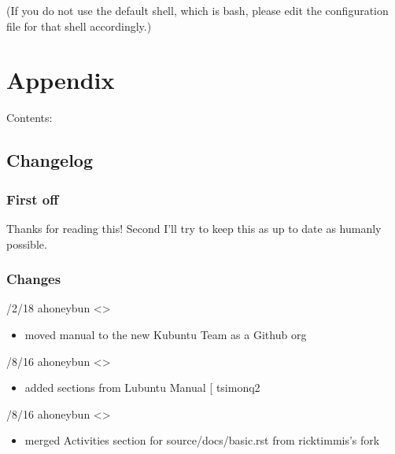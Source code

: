 \documentclass[letterpaper,10pt,english]{sphinxmanual}
\begin{document}
\sphinxAtStartPar
(If you do not use the default shell, which is bash, please edit the configuration file for that shell accordingly.)


\chapter{Appendix}
\label{\detokenize{docs/appendix/appendix:appendix}}\label{\detokenize{docs/appendix/appendix::doc}}
\sphinxAtStartPar
Contents:


\section{Changelog}
\label{\detokenize{docs/appendix/changes:changelog}}\label{\detokenize{docs/appendix/changes::doc}}

\subsection{First off}
\label{\detokenize{docs/appendix/changes:first-off}}
\sphinxAtStartPar
Thanks for reading this! Second I’ll try to keep this as up to date as humanly possible.


\subsection{Changes}
\label{\detokenize{docs/appendix/changes:changes}}
/2/18 \sphinxhyphen{} ahoneybun \textless{}\textgreater{}
\begin{itemize}
\item {} 
\sphinxAtStartPar
moved manual to the new Kubuntu Team as a Github org

\end{itemize}

/8/16 \sphinxhyphen{} ahoneybun \textless{}\textgreater{}
\begin{itemize}
\item {} 
\sphinxAtStartPar
added sections from Lubuntu Manual {[}\sphinxurl{https://github.com/tsimonq2/lubuntu-manual}{]}
\sphinxhyphen{} tsimonq2

\end{itemize}

/8/16 \sphinxhyphen{} ahoneybun \textless{}\textgreater{}
\begin{itemize}
\item {} 
\sphinxAtStartPar
merged Activities section for source/docs/basic.rst from ricktimmis’s fork

\end{itemize}
\end{document}
